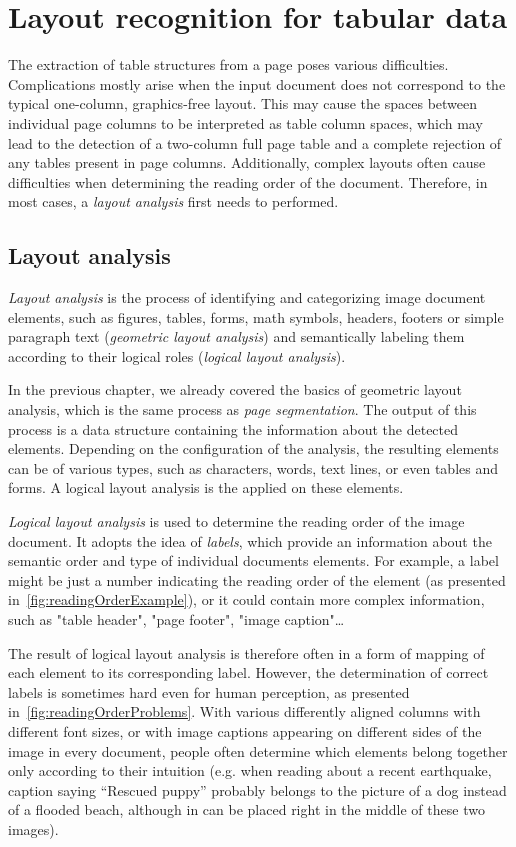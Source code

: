 \chapter{Layout recognition for tabular data}

The extraction of table structures from a page poses various difficulties. Complications mostly arise when the input document does not correspond to the typical one-column, graphics-free layout. This may cause the spaces between individual page columns to be interpreted as table column spaces, which may lead to the detection of a two-column full page table and a complete rejection of any tables present in page columns. Additionally, complex layouts often cause difficulties when determining the reading order of the document. Therefore, in most cases, a \emph{layout analysis} first needs to performed.

\section{Layout analysis}

\emph{Layout analysis} is the process of identifying and categorizing image document elements, such as figures, tables, forms, math symbols, headers, footers or simple paragraph text (\emph{geometric layout analysis}) and semantically labeling them according to their logical roles (\emph{logical layout analysis}).

In the previous chapter, we already covered the basics of geometric layout analysis, which is the same process as \emph{page segmentation}. The output of this process is a data structure containing the information about the detected elements. Depending on the configuration of the analysis, the resulting elements can be of various types, such as characters, words, text lines, or even tables and forms. A logical layout analysis is the applied on these elements.

\emph{Logical layout analysis} is used to determine the reading order of the image document. It adopts the idea of \emph{labels}, which provide an information about the semantic order and type of individual documents elements. For example, a label might be just a number indicating the reading order of the element (as presented in~\cref{fig:readingOrderExample}), or it could contain more complex information, such as "table header", "page footer", "image caption"\ldots

The result of logical layout analysis is therefore often in a form of mapping of each element to its corresponding label. However, the determination of correct labels is sometimes hard even for human perception, as presented in~\cref{fig:readingOrderProblems}. With various differently aligned columns with different font sizes, or with image captions appearing on different sides of the image in every document, people often determine which elements belong together only according to their intuition (e.g. when reading about a recent earthquake, caption saying “Rescued puppy” probably belongs to the picture of a dog instead of a flooded beach, although in can be placed right in the middle of these two images).

